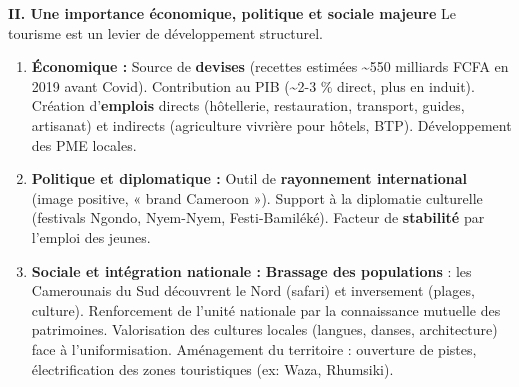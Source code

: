 \documentclass[11pt]{article}
\begin{document}
\begin{corrige}
\textbf{II. Une importance économique, politique et sociale majeure}
Le tourisme est un levier de développement structurel.
\begin{enumerate}
\item \textbf{Économique :} Source de \textbf{devises} (recettes estimées \textasciitilde 550 milliards FCFA en 2019 avant Covid). Contribution au PIB (\textasciitilde 2-3 \% direct, plus en induit). Création d'\textbf{emplois} directs (hôtellerie, restauration, transport, guides, artisanat) et indirects (agriculture vivrière pour hôtels, BTP). Développement des PME locales.
\item \textbf{Politique et diplomatique :} Outil de \textbf{rayonnement international} (image positive, « brand Cameroon »). Support à la diplomatie culturelle (festivals Ngondo, Nyem-Nyem, Festi-Bamiléké). Facteur de \textbf{stabilité} par l'emploi des jeunes.
\item \textbf{Sociale et intégration nationale :} \textbf{Brassage des populations} : les Camerounais du Sud découvrent le Nord (safari) et inversement (plages, culture). Renforcement de l'unité nationale par la connaissance mutuelle des patrimoines. Valorisation des cultures locales (langues, danses, architecture) face à l'uniformisation. Aménagement du territoire : ouverture de pistes, électrification des zones touristiques (ex: Waza, Rhumsiki).
\end{enumerate}


\end{corrige}
\end{document}
